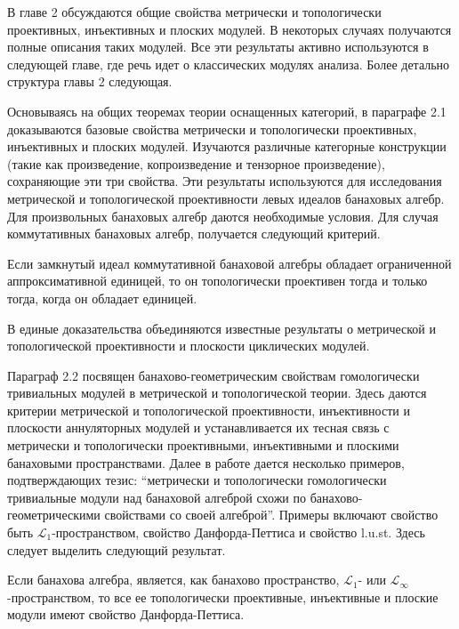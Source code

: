 В главе 2 обсуждаются общие свойства метрически и топологически проективных,
инъективных и плоских модулей. В некоторых случаях получаются полные описания
таких модулей. Все эти результаты активно используются в следующей главе, где
речь идет о классических модулях анализа. Более детально структура главы 2
следующая.

Основываясь на общих теоремах теории оснащенных категорий, в параграфе 2.1
доказываются базовые свойства метрически и топологически проективных,
инъективных и плоских модулей. Изучаются различные категорные конструкции (такие
как произведение, копроизведение и тензорное произведение), сохраняющие эти три
свойства. Эти результаты используются для исследования метрической и
топологической проективности левых идеалов банаховых алгебр. Для произвольных
банаховых алгебр даются необходимые условия. Для случая коммутативных банаховых
алгебр, получается следующий критерий.

\begin{theorem*}[2.1.16] Если замкнутый идеал коммутативной банаховой алгебры
    обладает ограниченной аппроксимативной единицей, то он топологически проективен
    тогда и только тогда, когда он обладает единицей.
\end{theorem*}

В единые доказательства объединяются известные результаты о метрической и
топологической проективности и плоскости циклических модулей.

Параграф 2.2 посвящен банахово-геометрическим свойствам гомологически
тривиальных модулей в метрической и топологической теории. Здесь даются критерии
метрической и топологической проективности, инъективности и плоскости
аннуляторных модулей и устанавливается их тесная связь с метрически и
топологически проективными, инъективными и плоскими банаховыми пространствами.
Далее в работе дается несколько примеров, подтверждающих тезис: ``метрически и
топологически гомологически тривиальные модули над банаховой алгеброй схожи по
банахово-геометрическими свойствами со своей алгеброй''. Примеры включают
свойство быть $\mathscr{L}_1$-пространством, свойство Данфорда-Петтиса и
свойство l.u.st. Здесь следует выделить следующий результат.

\begin{theorem*}[2.2.13] Если банахова алгебра, является, как банахово
    пространство, $\mathscr{L}_1$- или $\mathscr{L}_\infty$-пространством, то все ее
    топологически проективные, инъективные и плоские модули имеют свойство
    Данфорда-Петтиса.
\end{theorem*}


